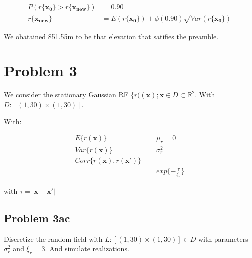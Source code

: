 \documentclass[]{article}
\newcommand{\vect}[1]{\ensuremath{\boldsymbol{\mathbf{#1}}}}
\begin{document}
\begin{equation*}
    \begin{split}    
P(r\{\vect{x_0}\} >r\{\vect{x_{new}}\} ) &= 0.90\\
r\{\vect{x_{new}}\} &= E(r\{\vect{x_0}\}) + \phi(0.90) \sqrt{Var(r\{\vect{x_0}\})}
  \end{split}
\end{equation*}

We obatained 851.55m to be that elevation that satifies the preamble.

\newpage 

\section{Problem 3}\label{problem-3}

We consider the stationary Gaussian RF
\(\lbrace r((\vect x); \vect x \in D \subset \mathbb{R}^2\). With
\(D:\left[(1,30) \times (1,30) \right]\).

With:

\begin{equation}
    \begin{split}
        E\lbrace r(\vect x) \rbrace &= \mu_r = 0 \\
        Var\lbrace r(\vect x) \rbrace &= \sigma_r^2 \\
        Corr\lbrace r(\vect x), r(\vect x')\rbrace \\
        &= exp\lbrace -\frac{\tau}{\xi_r}\rbrace
    \end{split}
\end{equation}

with \(\tau = |\vect x - \vect x'|\)

\subsection{Problem 3ac}\label{problem-3ac}

Discretize the random field with
\(L:\left[(1,30) \times (1,30)\right] \in D\) with parameters
\(\sigma_r^2\) and \(\xi_r = 3\). And simulate realizations.
\end{document}
